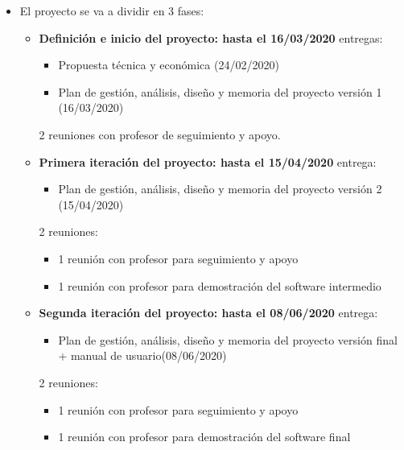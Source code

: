 \documentclass{article}
\begin{document}
\begin{itemize}
	\item El proyecto se va a dividir en 3 fases:
	\begin{itemize}
		
		\item \textbf{Definición e inicio del proyecto: hasta el 16/03/2020}
		\hfill {} entregas: \begin{itemize}
			\item Propuesta técnica y económica (24/02/2020)
			\item Plan de gestión, análisis, diseño y memoria del proyecto versión 1 (16/03/2020)
		\end{itemize}
		2 reuniones con profesor de seguimiento y apoyo.
		\item \textbf{Primera iteración del proyecto: hasta el 15/04/2020}
		\hfill {} entrega: \begin{itemize}
			\item Plan de gestión, análisis, diseño y memoria del proyecto versión 2 (15/04/2020)
		\end{itemize}
		2 reuniones:
		\begin{itemize}
			\item 1 reunión con profesor para seguimiento y apoyo
			\item 1 reunión con profesor para demostración del software intermedio
		\end{itemize}
		\item \textbf{Segunda iteración del proyecto: hasta el 08/06/2020}
		\hfill {} entrega: \begin{itemize}
			\item Plan de gestión, análisis, diseño y memoria del proyecto versión final + manual de usuario(08/06/2020)
		\end{itemize}
		2 reuniones:
		\begin{itemize}
			\item 1 reunión con profesor para seguimiento y apoyo
			\item 1 reunión con profesor para demostración del software final
		\end{itemize}
	\end{itemize}
\end{itemize}

\newpage
\end{document}
